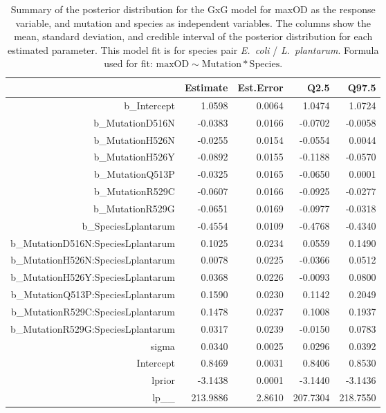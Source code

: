 \begin{table}[ht]
\centering
\begin{tabular}{rrrrr}
  \hline
 & Estimate & Est.Error & Q2.5 & Q97.5 \\ 
  \hline
b\_Intercept & 1.0598 & 0.0064 & 1.0474 & 1.0724 \\ 
  b\_MutationD516N & -0.0383 & 0.0166 & -0.0702 & -0.0058 \\ 
  b\_MutationH526N & -0.0255 & 0.0154 & -0.0554 & 0.0044 \\ 
  b\_MutationH526Y & -0.0892 & 0.0155 & -0.1188 & -0.0570 \\ 
  b\_MutationQ513P & -0.0325 & 0.0165 & -0.0650 & 0.0001 \\ 
  b\_MutationR529C & -0.0607 & 0.0166 & -0.0925 & -0.0277 \\ 
  b\_MutationR529G & -0.0651 & 0.0169 & -0.0977 & -0.0318 \\ 
  b\_SpeciesLplantarum & -0.4554 & 0.0109 & -0.4768 & -0.4340 \\ 
  b\_MutationD516N:SpeciesLplantarum & 0.1025 & 0.0234 & 0.0559 & 0.1490 \\ 
  b\_MutationH526N:SpeciesLplantarum & 0.0078 & 0.0225 & -0.0366 & 0.0512 \\ 
  b\_MutationH526Y:SpeciesLplantarum & 0.0368 & 0.0226 & -0.0093 & 0.0800 \\ 
  b\_MutationQ513P:SpeciesLplantarum & 0.1590 & 0.0230 & 0.1142 & 0.2049 \\ 
  b\_MutationR529C:SpeciesLplantarum & 0.1478 & 0.0237 & 0.1008 & 0.1937 \\ 
  b\_MutationR529G:SpeciesLplantarum & 0.0317 & 0.0239 & -0.0150 & 0.0783 \\ 
  sigma & 0.0340 & 0.0025 & 0.0296 & 0.0392 \\ 
  Intercept & 0.8469 & 0.0031 & 0.8406 & 0.8530 \\ 
  lprior & -3.1438 & 0.0001 & -3.1440 & -3.1436 \\ 
  lp\_\_ & 213.9886 & 2.8610 & 207.7304 & 218.7550 \\ 
   \hline
\end{tabular}
\caption{Summary of the posterior distribution for the GxG model for maxOD as the response variable, and mutation and species as independent variables. The columns show the mean, standard deviation, and credible interval of the posterior distribution for each estimated parameter. This model fit is for species pair \textit{E.~coli} / \textit{L.~plantarum}.  Formula used for fit: $\text{maxOD} \sim \text{Mutation} * \text{Species}$.} 
\label{supptab:GxG_maxOD_EC_LP}
\end{table}



